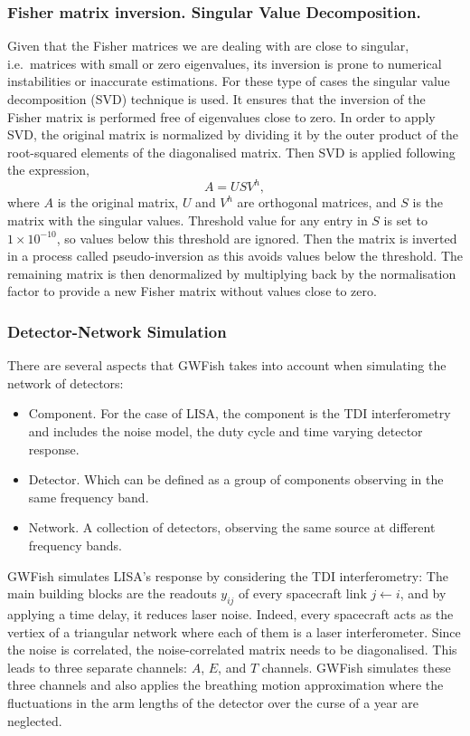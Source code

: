 \documentclass[a4paper,12pt]{article}
\begin{document}
\subsubsection{Fisher matrix inversion. Singular Value Decomposition.}
\label{subsec:Fisherinversion}

Given that the Fisher matrices we are dealing with are close to singular, i.e.\ matrices with small or zero eigenvalues, its inversion is prone to numerical instabilities or inaccurate estimations. For these type of cases the singular value decomposition (SVD) technique is used. It ensures that the inversion of the Fisher matrix is performed free of eigenvalues close to zero. In order to apply SVD, the original matrix is normalized by dividing it by the outer product of the root-squared elements of the diagonalised matrix. Then SVD is applied following the expression,
\begin{equation}
A = U S V^{h},
\label{SVD}
\end{equation}
where $A$ is the original matrix, $U$ and $V^{h}$ are orthogonal matrices, and $S$ is the matrix with the singular values. Threshold value for any entry in $S$ is set to $1 \times 10^{-10}$, so values below this threshold are ignored. Then the matrix is inverted in a process called pseudo-inversion as this avoids values below the threshold. The remaining matrix is then denormalized by multiplying back by the normalisation factor to provide a new Fisher matrix without values close to zero.  

\subsubsection{Detector-Network Simulation}
\label{subsec:detnetworksim}

There are several aspects that GWFish takes into account when simulating the network of detectors:
\begin{itemize}
    \item Component. For the case of LISA, the component is the TDI interferometry and includes the noise model, the duty cycle and time varying detector response.  
    \item Detector. Which can be defined as a group of components observing in the same frequency band.
    \item Network. A collection of detectors, observing the same source at different frequency bands.
\end{itemize}

GWFish simulates LISA's response by considering the TDI interferometry: The main building blocks are the readouts $y_{ij}$ of every spacecraft link $j \longleftarrow i$, and by applying a time delay, it reduces laser noise. Indeed, every spacecraft acts as the vertiex of a triangular network where each of them is a laser interferometer. Since the noise is correlated, the noise-correlated matrix needs to be diagonalised. This leads to three separate channels: $A$, $E$, and $T$ channels. GWFish simulates these three channels and also applies the breathing motion approximation where the fluctuations in the arm lengths of the detector over the curse of a year are neglected.
\end{document}
